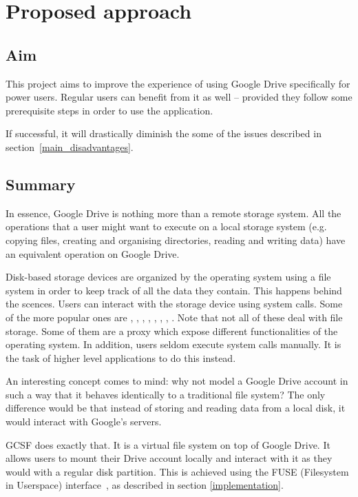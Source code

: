 \chapter{Proposed approach}\label{proposed_approach}

\section{Aim}

This project aims to improve the experience of using Google Drive specifically for power users. Regular users can benefit from it as well -- provided they follow some prerequisite steps in order to use the application.

If successful, it will drastically diminish the some of the issues described in section~\ref{main_disadvantages}.

\section{Summary}

In essence, Google Drive is nothing more than a remote storage system. All the operations that a user might want to execute on a local storage system (e.g. copying files, creating and organising directories, reading and writing data) have an equivalent operation on Google Drive.

Disk-based storage devices are organized by the operating system using a file system in order to keep track of all the data they contain. This happens behind the scences. Users can interact with the storage device using system calls. Some of the more popular ones are , , , , , , , . Note that not all of these deal with file storage. Some of them are a proxy which expose different functionalities of the operating system. In addition, users seldom execute system calls manually. It is the task of higher level applications to do this instead.

An interesting concept comes to mind: why not model a Google Drive account in such a way that it behaves identically to a traditional file system? The only difference would be that instead of storing and reading data from a local disk, it would interact with Google's servers.

GCSF does exactly that. It is a virtual file system on top of Google Drive. It allows users to mount their Drive account locally and interact with it as they would with a regular disk partition. This is achieved using the FUSE (Filesystem in Userspace) interface~\cite{libfuse}, as described in section \ref{implementation}.


